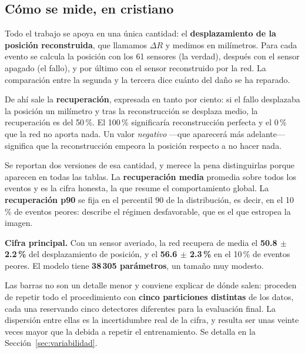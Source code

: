 \documentclass[11pt,a4paper]{article}
\begin{document}
\subsection{Cómo se mide, en cristiano}

Todo el trabajo se apoya en una única cantidad: el \textbf{desplazamiento de la posición
reconstruida}, que llamamos $\Delta R$ y medimos en milímetros. Para cada evento se calcula
la posición con los 61 sensores (la verdad), después con el sensor apagado (el fallo), y por
último con el sensor reconstruido por la red. La comparación entre la segunda y la tercera
dice cuánto del daño se ha reparado.

De ahí sale la \textbf{recuperación}, expresada en tanto por ciento: si el fallo desplazaba
la posición un milímetro y tras la reconstrucción se desplaza medio, la recuperación es del
50\,\%. El 100\,\% significaría reconstrucción perfecta y el 0\,\% que la red no aporta
nada. Un valor \emph{negativo} ---que aparecerá más adelante--- significa que la
reconstrucción empeora la posición respecto a no hacer nada.

Se reportan dos versiones de esa cantidad, y merece la pena distinguirlas porque aparecen en
todas las tablas. La \textbf{recuperación media} promedia sobre todos los eventos y es la
cifra honesta, la que resume el comportamiento global. La \textbf{recuperación p90} se fija
en el percentil 90 de la distribución, es decir, en el 10\,\% de eventos peores: describe el
régimen desfavorable, que es el que estropea la imagen.

\begin{idea}
\noindent\textbf{Cifra principal.} Con un sensor averiado, la red recupera de media el
\textbf{50.8 $\pm$ 2.2\,\%} del desplazamiento de posición, y el
\textbf{56.6 $\pm$ 2.3\,\%} en el 10\,\% de eventos peores. El modelo tiene
\textbf{38\,305 parámetros}, un tamaño muy modesto.

\smallskip
\noindent Las barras no son un detalle menor y conviene explicar de dónde salen: proceden de
repetir todo el procedimiento con \textbf{cinco particiones distintas} de los datos, cada una
reservando cinco detectores diferentes para la evaluación final. La dispersión entre ellas es
la incertidumbre real de la cifra, y resulta ser unas veinte veces mayor que la debida a
repetir el entrenamiento. Se detalla en la Sección~\ref{sec:variabilidad}.
\end{idea}
\end{document}
